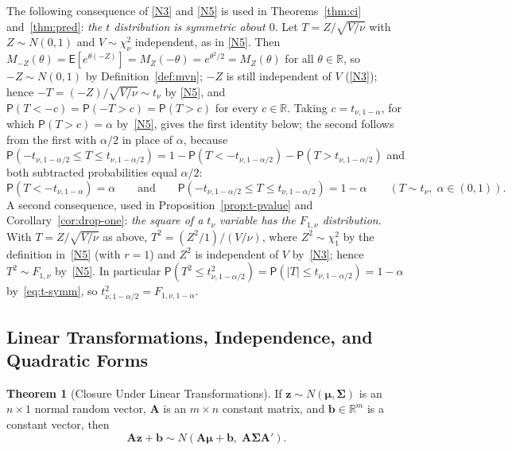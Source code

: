 \documentclass[12pt,a4paper]{article}
\theoremstyle{definition}
\newtheorem{theorem}{Theorem}[section]
\newcommand\expc{\mathsf{E}}
\newcommand\prb{\mathsf{P}}
\newcommand{\bz}{\mathbf{z}}
\newcommand{\bA}{\mathbf{A}}
\newcommand{\Real}{\mathbb{R}}
\begin{document}
The following consequence of \ref{N3} and \ref{N5} is used in Theorems~\ref{thm:ci} and~\ref{thm:pred}: \emph{the $t$ distribution is symmetric about $0$}. Let $T = Z/\sqrt{V/\nu}$ with $Z \sim N(0,1)$ and $V \sim \chi^2_\nu$ independent, as in \ref{N5}. Then $M_{-Z}(\theta) = \expc[e^{\theta(-Z)}] = M_Z(-\theta) = e^{\theta^2/2} = M_Z(\theta)$ for all $\theta \in \Real$, so $-Z \sim N(0,1)$ by Definition~\ref{def:mvn}; $-Z$ is still independent of $V$ (\ref{N3}); hence $-T = (-Z)/\sqrt{V/\nu} \sim t_\nu$ by \ref{N5}, and $\prb(T < -c) = \prb(-T > c) = \prb(T > c)$ for every $c \in \Real$. Taking $c = t_{\nu,1-\alpha}$, for which $\prb(T > c) = \alpha$ by~\ref{N5}, gives the first identity below; the second follows from the first with $\alpha/2$ in place of $\alpha$, because $\prb(-t_{\nu,1-\alpha/2} \leqslant T \leqslant t_{\nu,1-\alpha/2}) = 1 - \prb(T < -t_{\nu,1-\alpha/2}) - \prb(T > t_{\nu,1-\alpha/2})$ and both subtracted probabilities equal $\alpha/2$:
\begin{equation}\label{eq:t-symm}
\prb(T < -t_{\nu,1-\alpha}) = \alpha \qquad\text{and}\qquad \prb(-t_{\nu,1-\alpha/2} \leqslant T \leqslant t_{\nu,1-\alpha/2}) = 1 - \alpha \qquad (T \sim t_\nu,\; \alpha \in (0,1)).
\end{equation}
A second consequence, used in Proposition~\ref{prop:t-pvalue} and Corollary~\ref{cor:drop-one}: \emph{the square of a $t_\nu$ variable has the $F_{1,\nu}$ distribution}. With $T = Z/\sqrt{V/\nu}$ as above, $T^2 = (Z^2/1)/(V/\nu)$, where $Z^2 \sim \chi^2_1$ by the definition in~\ref{N5} (with $r = 1$) and $Z^2$ is independent of $V$ by~\ref{N3}; hence $T^2 \sim F_{1,\nu}$ by~\ref{N5}. In particular $\prb(T^2 \leqslant t_{\nu,1-\alpha/2}^2) = \prb(|T| \leqslant t_{\nu,1-\alpha/2}) = 1 - \alpha$ by~\eqref{eq:t-symm}, so $t_{\nu,1-\alpha/2}^2 = F_{1,\nu,1-\alpha}$.

\subsection{Linear Transformations, Independence, and Quadratic Forms}

\begin{theorem}[Closure Under Linear Transformations]\label{thm:mvn-linear}
If $\bz \sim N(\boldsymbol\mu, \boldsymbol\Sigma)$ is an $n \times 1$ normal random vector, $\bA$ is an $m \times n$ constant matrix, and $\mathbf{b} \in \Real^m$ is a constant vector, then
\begin{equation}
\bA\bz + \mathbf{b} \sim N(\bA\boldsymbol\mu + \mathbf{b},\; \bA\boldsymbol\Sigma\bA').
\end{equation}
\end{theorem}
\end{document}
